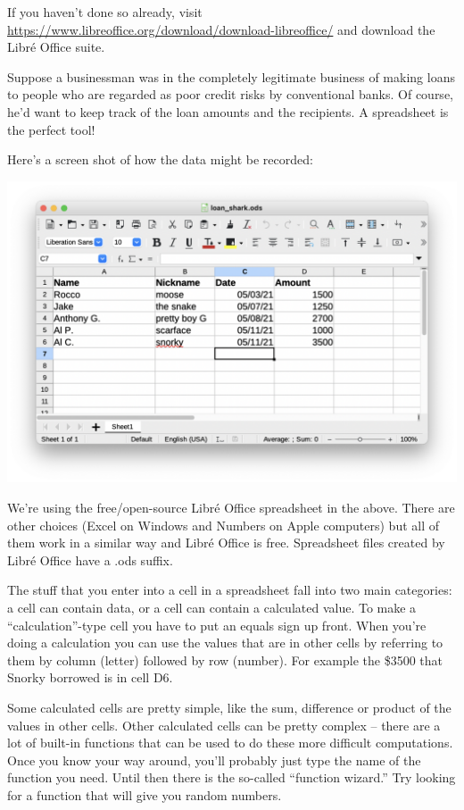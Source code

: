 If you haven't done so already, visit \url{https://www.libreoffice.org/download/download-libreoffice/} and download the Libr\'{e} Office suite.

Suppose a businessman was in the completely legitimate business of making loans to people who are regarded as poor credit risks by conventional banks.  Of course, he'd want to keep track of the loan amounts and the recipients.  A spreadsheet is the perfect tool!

Here's a screen shot of how the data might be recorded:

\centerline{\includegraphics[scale=.5]{loans.png}}

We're using the free/open-source Libr\'{e} Office spreadsheet in the above.  There are other choices (Excel on Windows and Numbers on Apple computers) but all of them work in a similar way and Libr\'{e} Office is free.  Spreadsheet files created by Libr\'{e} Office have a .ods suffix.  

The stuff that you enter into a cell in a spreadsheet fall into two main categories: a cell can contain data, or a cell can contain a calculated value.  To make a ``calculation''-type cell you have to put an equals sign up front.  When you're doing a calculation you can use the values that are in other cells by referring to them by column (letter) followed by row (number).  For example the \$3500 that Snorky borrowed is in cell D6.

Some calculated cells are pretty simple, like the sum, difference or product of the values in other cells.
Other calculated cells can be pretty complex -- there are a lot of built-in functions that can be used to do these more difficult computations.  Once you know your way around, you'll probably just type the name of the function you need.  Until then there is the so-called ``function wizard.''  Try looking for a function that will give you random numbers.

